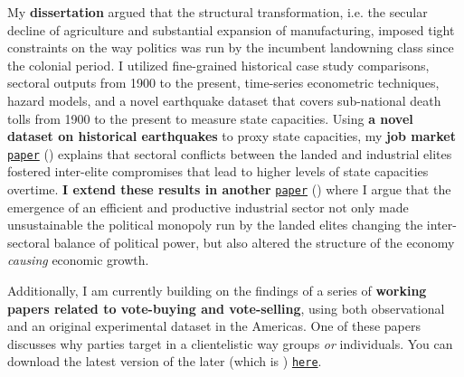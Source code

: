 \documentclass[10pt,stdletter,dateno,sigleft]{newlfm} %
\begin{document}
\begin{newlfm}
My {\bf dissertation} argued that the structural transformation, i.e. the secular decline of agriculture and substantial expansion of manufacturing, imposed tight constraints on the way politics was run by the incumbent landowning class since the colonial period. I utilized fine-grained historical case study comparisons, sectoral outputs from 1900 to the present, time-series econometric techniques, hazard models, and a novel earthquake dataset that covers sub-national death tolls from 1900 to the present to measure state capacities. Using {\bf a novel dataset on historical earthquakes} to proxy state capacities, my {\bf job market} \href{https://github.com/hbahamonde/Earthquake_Paper/raw/master/Bahamonde_Earthquake_Paper.pdf}{\texttt{paper}} (\emph{\unskip}) explains that sectoral conflicts between the landed and industrial elites fostered inter-elite compromises that lead to higher levels of state capacities overtime. {\bf I extend these results in another} \href{https://github.com/hbahamonde/Negative_Link_Paper/raw/master/Bahamonde_NegativeLink.pdf}{\texttt{paper}} (\emph{\unskip}) where I argue that the emergence of an efficient and productive industrial sector not only made unsustainable the political monopoly run by the landed elites changing the inter-sectoral balance of political power, but also altered the structure of the economy \emph{causing} economic growth. 


Additionally, I am currently building on the findings of a series of {\bf working papers related to vote-buying and vote-selling}, using both observational and an original experimental dataset in the Americas. One of these papers discusses why parties target in a clientelistic way groups \emph{or} individuals. You can download the latest version of the later (which is \emph{\unskip}) \href{https://github.com/hbahamonde/Clientelism_paper/raw/master/Bahamonde_Clientelism_Paper.pdf}{\texttt{here}}. 



{\unskip}




\end{newlfm}
\end{document}
